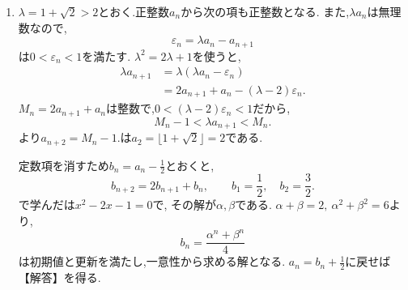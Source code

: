 \noindent {}\par\nobreak
\begin{enumerate}[label=(\arabic*),parsep=3pt,beginpenalty=10000,format=\bookitemlink{example-gauss-role-5}{solution}{problem}]
  \item $\lambda=1+\sqrt2>2$とおく.正整数$a_n$から次の項も正整数となる.
    また,$\lambda a_n$は無理数なので,
    \[
      \varepsilon_n=\lambda a_n-a_{n+1}
    \]
    は$0<\varepsilon_n<1$を満たす.
    $\lambda^2=2\lambda+1$を使うと,
    \begin{align*}
      \lambda a_{n+1}
      &=\lambda(\lambda a_n-\varepsilon_n)\\
      &=2a_{n+1}+a_n-(\lambda-2)\varepsilon_n.
    \end{align*}
    $M_n=2a_{n+1}+a_n$は整数で,$0<(\lambda-2)\varepsilon_n<1$だから,
    \[
      M_n-1<\lambda a_{n+1}<M_n.
    \]
    より$a_{n+2}=M_n-1$.は$a_2=\lfloor1+\sqrt2\rfloor=2$である.

    定数項を消すため$b_n=a_n-\frac12$とおくと,
    \[
      b_{n+2}=2b_{n+1}+b_n,
      \qquad b_1=\frac12,\quad b_2=\frac32.
    \]
    で学んだは$x^2-2x-1=0$で,
    その解が$\alpha,\beta$である.
    $\alpha+\beta=2,\ \alpha^2+\beta^2=6$より,
    \[
      b_n=\frac{\alpha^n+\beta^n}{4}
    \]
    は初期値と更新を満たし,一意性から求める解となる.
    $a_n=b_n+\frac12$に戻せば【解答】を得る.
\end{enumerate}
